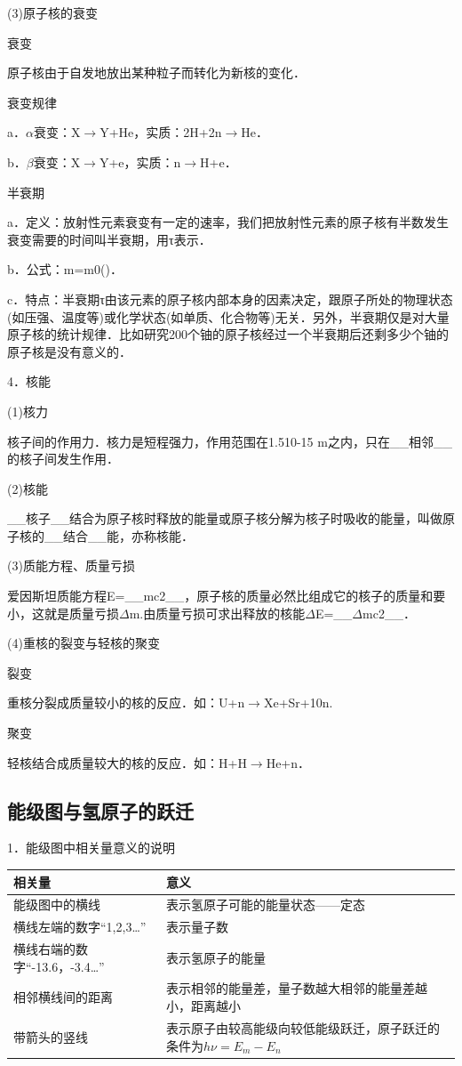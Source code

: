 (3)原子核的衰变

衰变

原子核由于自发地放出某种粒子而转化为新核的变化．

衰变规律

a．$\alpha$衰变：X$\rightarrow$Y+He，实质：2H+2n$\rightarrow$He．

b．$\beta$衰变：X$\rightarrow$Y+e，实质：n$\rightarrow$H+e．

半衰期

a．定义：放射性元素衰变有一定的速率，我们把放射性元素的原子核有半数发生衰变需要的时间叫半衰期，用τ表示．

b．公式：m=m0()．

c．特点：半衰期τ由该元素的原子核内部本身的因素决定，跟原子所处的物理状态(如压强、温度等)或化学状态(如单质、化合物等)无关．另外，半衰期仅是对大量原子核的统计规律．比如研究200个铀的原子核经过一个半衰期后还剩多少个铀的原子核是没有意义的．

4．核能

(1)核力

核子间的作用力．核力是短程强力，作用范围在1.510-15
m之内，只在\_\_相邻\_\_的核子间发生作用．

(2)核能

\_\_核子\_\_结合为原子核时释放的能量或原子核分解为核子时吸收的能量，叫做原子核的\_\_结合\_\_能，亦称核能．

(3)质能方程、质量亏损

爱因斯坦质能方程E=\_\_mc2\_\_，原子核的质量必然比组成它的核子的质量和要小，这就是质量亏损$\Delta$m.由质量亏损可求出释放的核能$\Delta$E=\_\_$\Delta$mc2\_\_．

(4)重核的裂变与轻核的聚变

裂变

重核分裂成质量较小的核的反应．如：U+n$\rightarrow$Xe+Sr+10n.　

聚变

轻核结合成质量较大的核的反应．如：H+H$\rightarrow$He+n．
\newpage
\subsection{能级图与氢原子的跃迁}

1．能级图中相关量意义的说明

\begin{longtable}[]{@{}m{5cm}m{7cm}@{}}
\toprule
相关量 & 意义\tabularnewline
\midrule
\endhead
能级图中的横线 & 表示氢原子可能的能量状态------定态\tabularnewline
横线左端的数字``1,2,3\ldots'' & 表示量子数\tabularnewline
横线右端的数字``-13.6，-3.4\ldots'' & 表示氢原子的能量\tabularnewline
相邻横线间的距离 &
表示相邻的能量差，量子数越大相邻的能量差越小，距离越小\tabularnewline
带箭头的竖线 &
表示原子由较高能级向较低能级跃迁，原子跃迁的条件为$h\nu=E_m-E_n$\tabularnewline
\bottomrule
\end{longtable}

